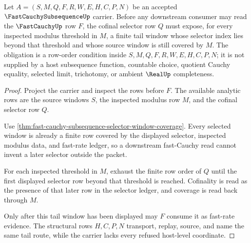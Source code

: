 \begin{theorem}
\label{thm:fast-cauchy-subsequence-cofinal-tail-obligation}
Let $A=(S,M,Q,F,R,W,E,H,C,P,N)$ be an accepted $\FastCauchySubsequenceUp$ carrier. Before any downstream consumer may read the $\FastCauchyUp$ row $F$, the cofinal selector row $Q$ must expose, for every inspected modulus threshold in $M$, a finite tail window whose selector index lies beyond that threshold and whose source window is still covered by $M$. The obligation is a row-order condition inside $S,M,Q,F,R,W,E,H,C,P,N$; it is not supplied by a host subsequence function, countable choice, quotient Cauchy equality, selected limit, trichotomy, or ambient $\RealUp$ completeness.
\end{theorem}
\begin{proof}
Project the carrier and inspect the rows before $F$. The available analytic rows are the source windows $S$, the inspected modulus row $M$, and the cofinal selector row $Q$.

Use \autoref{thm:fast-cauchy-subsequence-selector-window-coverage}. Every selected window is already a finite row covered by the displayed selector, inspected modulus data, and fast-rate ledger, so a downstream fast-Cauchy read cannot invent a later selector outside the packet.

For each inspected threshold in $M$, exhaust the finite row order of $Q$ until the first displayed selector row beyond that threshold is reached. Cofinality is read as the presence of that later row in the selector ledger, and coverage is read back through $M$.

Only after this tail window has been displayed may $F$ consume it as fast-rate evidence. The structural rows $H,C,P,N$ transport, replay, source, and name the same tail route, while the carrier lacks every refused host-level coordinate.
\end{proof}


